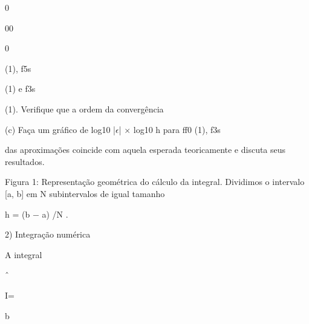 \documentclass[a4paper,portrait,12pt]{article}
\begin{document}
0


00


0


\begin{flushleft}
(1), f5s
\end{flushleft}


\begin{flushleft}
(1) e f3s
\end{flushleft}


\begin{flushleft}
(1). Verifique que a ordem da converg\^{e}ncia
\end{flushleft}


\begin{flushleft}
(c) Fa\c{c}a um gr\'{a}fico de log10 |$\epsilon$| × log10 h para ff0 (1), f3s
\end{flushleft}


\begin{flushleft}
das aproxima\c{c}\~{o}es coincide com aquela esperada teoricamente e discuta seus resultados.
\end{flushleft}










\begin{flushleft}
Figura 1: Representa\c{c}\~{a}o geom\'{e}trica do c\'{a}lculo da integral. Dividimos o intervalo [a, b] em N subintervalos de igual tamanho
\end{flushleft}


\begin{flushleft}
h = (b $-$ a) /N .
\end{flushleft}





\begin{flushleft}
2) Integra\c{c}\~{a}o num\'{e}rica
\end{flushleft}


\begin{flushleft}
A integral
\end{flushleft}


ˆ


\begin{flushleft}
I=
\end{flushleft}





\begin{flushleft}
b
\end{flushleft}
\end{document}
